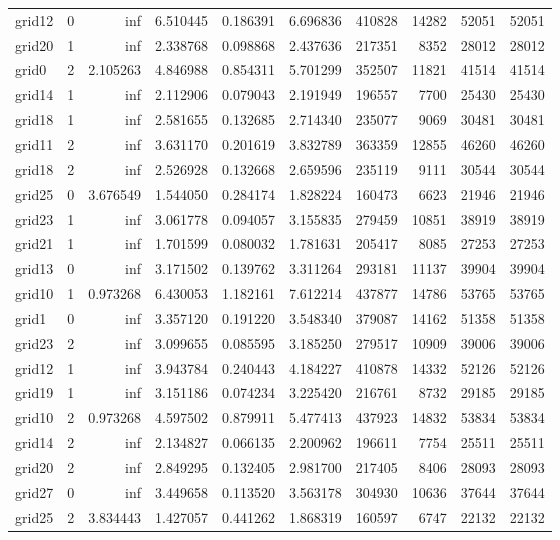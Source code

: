 \begin{longtable}{|l|r|r|r|r|r|r|r|r|r|}
grid12 & 0 & inf & 6.510445 & 0.186391 & 6.696836 & 410828 & 14282 & 52051 & 52051 \\
grid20 & 1 & inf & 2.338768 & 0.098868 & 2.437636 & 217351 & 8352 & 28012 & 28012 \\
grid0 & 2 & 2.105263 & 4.846988 & 0.854311 & 5.701299 & 352507 & 11821 & 41514 & 41514 \\
grid14 & 1 & inf & 2.112906 & 0.079043 & 2.191949 & 196557 & 7700 & 25430 & 25430 \\
grid18 & 1 & inf & 2.581655 & 0.132685 & 2.714340 & 235077 & 9069 & 30481 & 30481 \\
grid11 & 2 & inf & 3.631170 & 0.201619 & 3.832789 & 363359 & 12855 & 46260 & 46260 \\
grid18 & 2 & inf & 2.526928 & 0.132668 & 2.659596 & 235119 & 9111 & 30544 & 30544 \\
grid25 & 0 & 3.676549 & 1.544050 & 0.284174 & 1.828224 & 160473 & 6623 & 21946 & 21946 \\
grid23 & 1 & inf & 3.061778 & 0.094057 & 3.155835 & 279459 & 10851 & 38919 & 38919 \\
grid21 & 1 & inf & 1.701599 & 0.080032 & 1.781631 & 205417 & 8085 & 27253 & 27253 \\
grid13 & 0 & inf & 3.171502 & 0.139762 & 3.311264 & 293181 & 11137 & 39904 & 39904 \\
grid10 & 1 & 0.973268 & 6.430053 & 1.182161 & 7.612214 & 437877 & 14786 & 53765 & 53765 \\
grid1 & 0 & inf & 3.357120 & 0.191220 & 3.548340 & 379087 & 14162 & 51358 & 51358 \\
grid23 & 2 & inf & 3.099655 & 0.085595 & 3.185250 & 279517 & 10909 & 39006 & 39006 \\
grid12 & 1 & inf & 3.943784 & 0.240443 & 4.184227 & 410878 & 14332 & 52126 & 52126 \\
grid19 & 1 & inf & 3.151186 & 0.074234 & 3.225420 & 216761 & 8732 & 29185 & 29185 \\
grid10 & 2 & 0.973268 & 4.597502 & 0.879911 & 5.477413 & 437923 & 14832 & 53834 & 53834 \\
grid14 & 2 & inf & 2.134827 & 0.066135 & 2.200962 & 196611 & 7754 & 25511 & 25511 \\
grid20 & 2 & inf & 2.849295 & 0.132405 & 2.981700 & 217405 & 8406 & 28093 & 28093 \\
grid27 & 0 & inf & 3.449658 & 0.113520 & 3.563178 & 304930 & 10636 & 37644 & 37644 \\
grid25 & 2 & 3.834443 & 1.427057 & 0.441262 & 1.868319 & 160597 & 6747 & 22132 & 22132 \\

\end{longtable}
